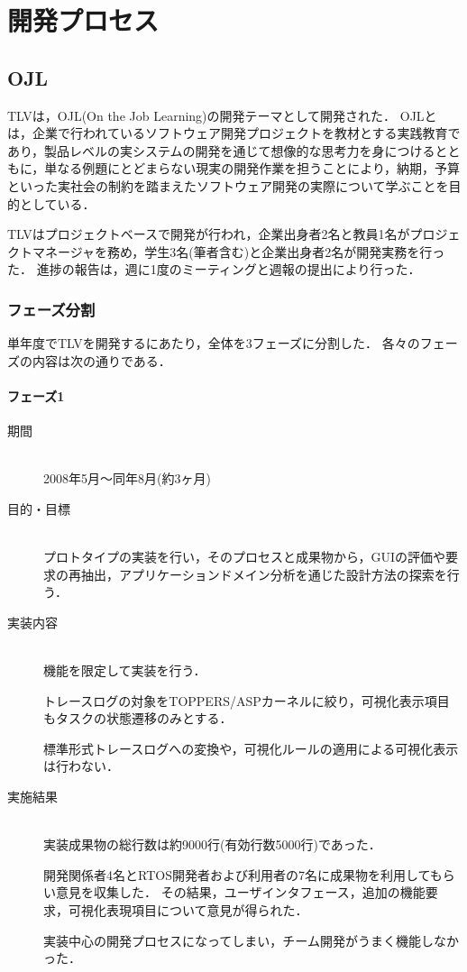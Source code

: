 \chapter{開発プロセス}

\section{OJL}

TLVは，OJL(On the Job Learning)の開発テーマとして開発された．
OJLとは，企業で行われているソフトウェア開発プロジェクトを教材とする実践教育であり，製品レベルの実システムの開発を通じて想像的な思考力を身につけるとともに，単なる例題にとどまらない現実の開発作業を担うことにより，納期，予算といった実社会の制約を踏まえたソフトウェア開発の実際について学ぶことを目的としている．

TLVはプロジェクトベースで開発が行われ，企業出身者2名と教員1名がプロジェクトマネージャを務め，学生3名(筆者含む)と企業出身者2名が開発実務を行った．
進捗の報告は，週に1度のミーティングと週報の提出により行った．

\subsection{フェーズ分割}

単年度でTLVを開発するにあたり，全体を3フェーズに分割した．
各々のフェーズの内容は次の通りである．

\subsubsection{フェーズ1}

\begin{description}
\item[期間] \mbox{} \\
2008年5月～同年8月(約3ヶ月)

\item[目的・目標] \mbox{} \\
プロトタイプの実装を行い，そのプロセスと成果物から，GUIの評価や要求の再抽出，アプリケーションドメイン分析を通じた設計方法の探索を行う．

\item[実装内容] \mbox{} \\
機能を限定して実装を行う．

トレースログの対象をTOPPERS/ASPカーネルに絞り，可視化表示項目もタスクの状態遷移のみとする．

標準形式トレースログへの変換や，可視化ルールの適用による可視化表示は行わない．

\item[実施結果] \mbox{} \\
実装成果物の総行数は約9000行(有効行数5000行)であった．

開発関係者4名とRTOS開発者および利用者の7名に成果物を利用してもらい意見を収集した．
その結果，ユーザインタフェース，追加の機能要求，可視化表現項目について意見が得られた．

実装中心の開発プロセスになってしまい，チーム開発がうまく機能しなかった．

\end{description}

